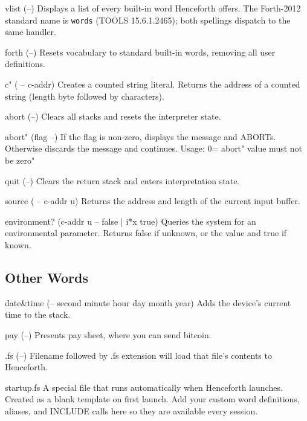 \documentclass[a4paper, 11pt, openany]{book}
\begin{document}
\begin{forthbox}
  vlist        (--)
               Displays a list of every built-in word Henceforth
               offers. The Forth-2012 standard name is
               \texttt{words} (TOOLS 15.6.1.2465); both spellings
               dispatch to the same handler.

  forth        (--)
               Resets vocabulary to standard built-in words,
               removing all user definitions.

  c"           ( -- c-addr)
               Creates a counted string literal. Returns the
               address of a counted string (length byte followed
               by characters).

  abort        (--)
               Clears all stacks and resets the interpreter state.

  abort"       (flag --)
               If the flag is non-zero, displays the message and
               ABORTs. Otherwise discards the message and
               continues.
               Usage: 0= abort" value must not be zero"

  quit         (--)
               Clears the return stack and enters interpretation
               state.

  source       ( -- c-addr u)
               Returns the address and length of the current
               input buffer.

  environment? (c-addr u -- false | i*x true)
               Queries the system for an environmental parameter.
               Returns false if unknown, or the value and true
               if known.
\end{forthbox}

\subsection{Other Words}

\begin{forthbox}
  date&time (-- second minute hour day month year)
            Adds the device's current time to the stack.

  pay       (--)
            Presents pay sheet, where you can send bitcoin.

  .fs       (--)
            Filename followed by .fs extension will load that
            file's contents to Henceforth.

  startup.fs
            A special file that runs automatically when
            Henceforth launches. Created as a blank template
            on first launch. Add your custom word definitions,
            aliases, and INCLUDE calls here so they are
            available every session.
\end{forthbox}
\end{document}
